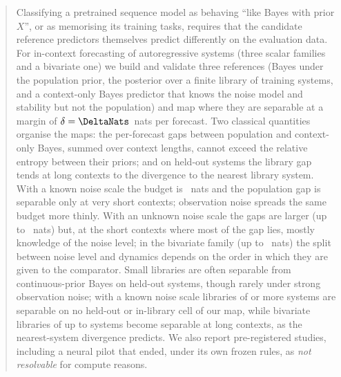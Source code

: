 \begin{abstract}
Classifying a pretrained sequence model as behaving ``like Bayes with prior $X$'', or as memorising its training tasks,
requires that the candidate reference predictors themselves predict differently on the evaluation data. For in-context
forecasting of autoregressive systems (three scalar families and a bivariate one) we build and validate three references
(Bayes under the population prior, the posterior over a finite library of training systems, and a context-only Bayes
predictor that knows the noise model and stability but not the population) and map where they are separable at a margin of
$\delta=\DeltaNats$~nats per forecast. Two classical quantities organise the maps: the per-forecast gaps between population
and context-only Bayes, summed over context lengths, cannot exceed the relative entropy between their priors; and on held-out
systems the library gap tends at long contexts to the divergence to the nearest library system. With a known noise scale the
budget is \KLoneA~nats and the population gap is separable only at very short contexts; observation noise spreads the same
budget more thinly. With an unknown noise scale the gaps are larger (up to \FoneGapMax~nats) but, at the short contexts where
most of the gap lies, mostly knowledge of the noise level; in the bivariate family (up to \FtwoGapMax~nats) the split between noise level and dynamics depends on the order in
which they are given to the comparator. Small libraries are often separable from continuous-prior Bayes on held-out systems,
though rarely under strong observation noise; with a known noise scale libraries of \LibBigKOneA or more systems are
separable on no held-out or in-library cell of our map, while bivariate libraries of up to \KThousand
systems become separable at long contexts, as the nearest-system divergence predicts. We also report pre-registered studies,
including a neural pilot that ended, under its own frozen rules, as \emph{not resolvable} for compute reasons.
\end{abstract}

